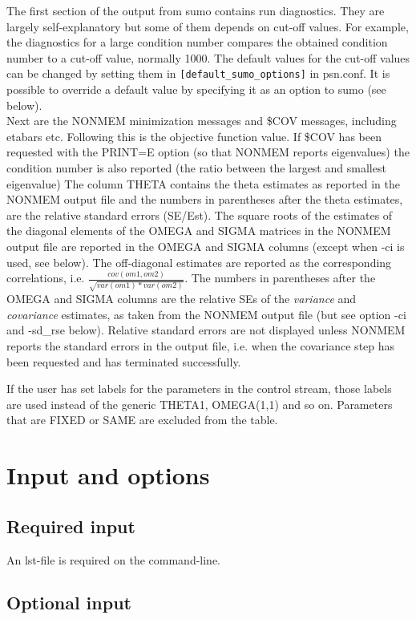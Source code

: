 The first section of the output from sumo contains run diagnostics. They are largely self-explanatory but some of them depends on cut-off values. For example, the diagnostics for a large condition number compares the obtained condition number to a cut-off value, normally 1000. The default values for the cut-off values can be changed by setting them in 
\verb|[default_sumo_options]| in psn.conf. It is possible to override a default value by specifying it as an option to sumo (see below).
\\ 
Next are the NONMEM minimization messages and \$COV messages, including etabars etc. Following this is the objective function value. If \$COV has been requested with the PRINT=E option (so that NONMEM reports eigenvalues) the condition number is also reported (the ratio between the largest and smallest eigenvalue)
The column THETA contains the theta estimates as reported in the NONMEM output file and the numbers in parentheses after the theta estimates, are the relative standard errors (SE/Est). The square roots of the estimates of the diagonal elements of the OMEGA and SIGMA matrices in the NONMEM output file are reported in the OMEGA and SIGMA columns (except when -ci is used, see below). The off-diagonal estimates are reported as the corresponding correlations, i.e. 
$\frac{cov(om1,om2)}{\sqrt{var(om1)*var(om2)}}$. 
The numbers in parentheses after the OMEGA and SIGMA columns are the relative SEs of the \emph{variance} and \emph{covariance} estimates, as taken from the NONMEM output file
(but see option -ci and -sd\_rse below).
Relative standard errors are not displayed unless NONMEM reports the standard errors in the output file, i.e. when the covariance step has been requested and has terminated successfully.

If the user has set labels for the parameters in the control stream, those labels are used instead of the
generic THETA1, OMEGA(1,1) and so on. Parameters that are FIXED or SAME are excluded from the table.

\section{Input and options}

\subsection{Required input}
An lst-file is required on the command-line.

\subsection{Optional input}

